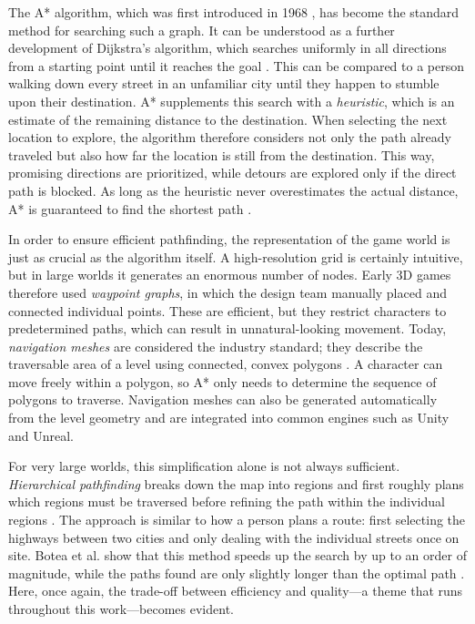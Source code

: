 The A* algorithm, which was first introduced in 1968 \cite{hart1968}, has become the standard method for searching such a graph. It can be understood as a further development of Dijkstra’s algorithm, which searches uniformly in all directions from a starting point until it reaches the goal \cite{dijkstra1959}. This can be compared to a person walking down every street in an unfamiliar city until they happen to stumble upon their destination. A* supplements this search with a \emph{heuristic}, which is an estimate of the remaining distance to the destination. When selecting the next location to explore, the algorithm therefore considers not only the path already traveled but also how far the location is still from the destination. This way, promising directions are prioritized, while detours are explored only if the direct path is blocked. As long as the heuristic never overestimates the actual distance, A* is guaranteed to find the shortest path \cite{hart1968}.

In order to ensure efficient pathfinding, the representation of the game world is just as crucial as the algorithm itself. A high-resolution grid is certainly intuitive, but in large worlds it generates an enormous number of nodes. Early 3D games therefore used \emph{waypoint graphs}, in which the design team manually placed and connected individual points. These are efficient, but they restrict characters to predetermined paths, which can result in unnatural-looking movement. Today, \emph{navigation meshes} are considered the industry standard; they describe the traversable area of a level using connected, convex polygons \cite{snook2000,millington2009}. A character can move freely within a polygon, so A* only needs to determine the sequence of polygons to traverse. Navigation meshes can also be generated automatically from the level geometry and are integrated into common engines such as Unity and Unreal.

For very large worlds, this simplification alone is not always sufficient. \emph{Hierarchical pathfinding} breaks down the map into regions and first roughly plans which regions must be traversed before refining the path within the individual regions \cite{botea2004}. The approach is similar to how a person plans a route: first selecting the highways between two cities and only dealing with the individual streets once on site. Botea et al. show that this method speeds up the search by up to an order of magnitude, while the paths found are only slightly longer than the optimal path \cite{botea2004}. Here, once again, the trade-off between efficiency and quality—a theme that runs throughout this work—becomes evident.

